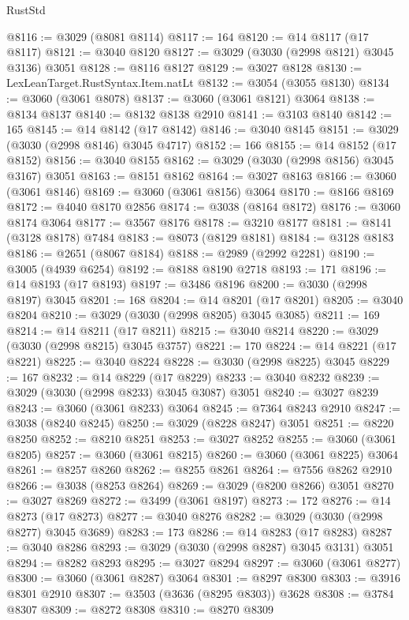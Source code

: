\begin{lexlean}{RustStd}
\begin{coremodule}
@8116 := @3029 (@8081 @8114)
@8117 := 164
@8120 := @14 @8117 (@17 @8117)
@8121 := @3040 @8120
@8127 := @3029 (@3030 (@2998 @8121) @3045 @3136) @3051
@8128 := @8116 @8127
@8129 := @3027 @8128
@8130 := LexLeanTarget.RustSyntax.Item.natLt
@8132 := @3054 (@3055 @8130)
@8134 := @3060 (@3061 @8078)
@8137 := @3060 (@3061 @8121) @3064
@8138 := @8134 @8137
@8140 := @8132 @8138 @2910
@8141 := @3103 @8140
@8142 := 165
@8145 := @14 @8142 (@17 @8142)
@8146 := @3040 @8145
@8151 := @3029 (@3030 (@2998 @8146) @3045 @4717)
@8152 := 166
@8155 := @14 @8152 (@17 @8152)
@8156 := @3040 @8155
@8162 := @3029 (@3030 (@2998 @8156) @3045 @3167) @3051
@8163 := @8151 @8162
@8164 := @3027 @8163
@8166 := @3060 (@3061 @8146)
@8169 := @3060 (@3061 @8156) @3064
@8170 := @8166 @8169
@8172 := @4040 @8170 @2856
@8174 := @3038 (@8164 @8172)
@8176 := @3060 @8174 @3064
@8177 := @3567 @8176
@8178 := @3210 @8177
@8181 := @8141 (@3128 @8178) @7484
@8183 := @8073 (@8129 @8181)
@8184 := @3128 @8183
@8186 := @2651 (@8067 @8184)
@8188 := @2989 (@2992 @2281)
@8190 := @3005 (@4939 @6254)
@8192 := @8188 @8190 @2718
@8193 := 171
@8196 := @14 @8193 (@17 @8193)
@8197 := @3486 @8196
@8200 := @3030 (@2998 @8197) @3045
@8201 := 168
@8204 := @14 @8201 (@17 @8201)
@8205 := @3040 @8204
@8210 := @3029 (@3030 (@2998 @8205) @3045 @3085)
@8211 := 169
@8214 := @14 @8211 (@17 @8211)
@8215 := @3040 @8214
@8220 := @3029 (@3030 (@2998 @8215) @3045 @3757)
@8221 := 170
@8224 := @14 @8221 (@17 @8221)
@8225 := @3040 @8224
@8228 := @3030 (@2998 @8225) @3045
@8229 := 167
@8232 := @14 @8229 (@17 @8229)
@8233 := @3040 @8232
@8239 := @3029 (@3030 (@2998 @8233) @3045 @3087) @3051
@8240 := @3027 @8239
@8243 := @3060 (@3061 @8233) @3064
@8245 := @7364 @8243 @2910
@8247 := @3038 (@8240 @8245)
@8250 := @3029 (@8228 @8247) @3051
@8251 := @8220 @8250
@8252 := @8210 @8251
@8253 := @3027 @8252
@8255 := @3060 (@3061 @8205)
@8257 := @3060 (@3061 @8215)
@8260 := @3060 (@3061 @8225) @3064
@8261 := @8257 @8260
@8262 := @8255 @8261
@8264 := @7556 @8262 @2910
@8266 := @3038 (@8253 @8264)
@8269 := @3029 (@8200 @8266) @3051
@8270 := @3027 @8269
@8272 := @3499 (@3061 @8197)
@8273 := 172
@8276 := @14 @8273 (@17 @8273)
@8277 := @3040 @8276
@8282 := @3029 (@3030 (@2998 @8277) @3045 @3689)
@8283 := 173
@8286 := @14 @8283 (@17 @8283)
@8287 := @3040 @8286
@8293 := @3029 (@3030 (@2998 @8287) @3045 @3131) @3051
@8294 := @8282 @8293
@8295 := @3027 @8294
@8297 := @3060 (@3061 @8277)
@8300 := @3060 (@3061 @8287) @3064
@8301 := @8297 @8300
@8303 := @3916 @8301 @2910
@8307 := @3503 (@3636 (@8295 @8303)) @3628
@8308 := @3784 @8307
@8309 := @8272 @8308
@8310 := @8270 @8309

\end{coremodule}
\end{lexlean}
